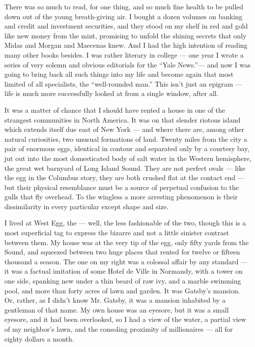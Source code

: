 \documentclass{znotebook}
\begin{document}
There was so much to read, for one thing, and so much fine health to be pulled down out of the young breath-giving air. I bought a dozen volumes on banking and credit and investment securities, and they stood on my shelf in red and gold like new money from the mint, promising to unfold the shining secrets that only Midas and Morgan and Maecenas knew. And I had the high intention of reading many other books besides. I was rather literary in college — one year I wrote a series of very solemn and obvious editorials for the ``Yale News.''— and now I was going to bring back all such things into my life and become again that most limited of all specialists, the ``well-rounded man.'' This isn't just an epigram — life is much more successfully looked at from a single window, after all.

It was a matter of chance that I should have rented a house in one of the strangest communities in North America. It was on that slender riotous island which extends itself due east of New York — and where there are, among other natural curiosities, two unusual formations of land. Twenty miles from the city a pair of enormous eggs, identical in contour and separated only by a courtesy bay, jut out into the most domesticated body of salt water in the Western hemisphere, the great wet barnyard of Long Island Sound. They are not perfect ovals — like the egg in the Columbus story, they are both crushed flat at the contact end — but their physical resemblance must be a source of perpetual confusion to the gulls that fly overhead. To the wingless a more arresting phenomenon is their dissimilarity in every particular except shape and size.

I lived at West Egg, the — well, the less fashionable of the two, though this is a most superficial tag to express the bizarre and not a little sinister contrast between them. My house was at the very tip of the egg, only fifty yards from the Sound, and squeezed between two huge places that rented for twelve or fifteen thousand a season. The one on my right was a colossal affair by any standard — it was a factual imitation of some Hotel de Ville in Normandy, with a tower on one side, spanking new under a thin beard of raw ivy, and a marble swimming pool, and more than forty acres of lawn and garden. It was Gatsby's mansion. Or, rather, as I didn't know Mr. Gatsby, it was a mansion inhabited by a gentleman of that name. My own house was an eyesore, but it was a small eyesore, and it had been overlooked, so I had a view of the water, a partial view of my neighbor's lawn, and the consoling proximity of millionaires — all for eighty dollars a month.
\end{document}
